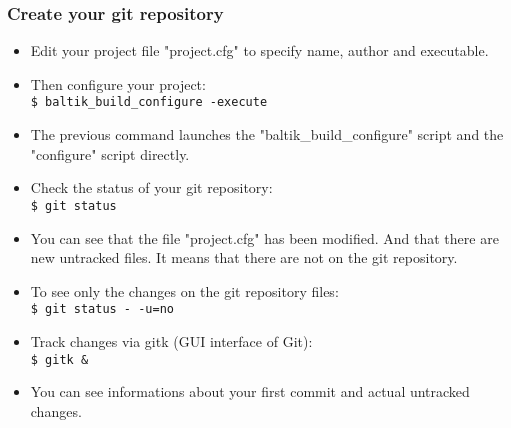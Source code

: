 \documentclass[10pt, hyperref={unicode=true,pdfusetitle, bookmarks=true,bookmarksnumbered=false,bookmarksopen=false, breaklinks=false,pdfborder={0 0 1},backref=true,colorlinks=true,linkcolor=darkblue,pageanchor, urlcolor=darkblue}]{beamer}
\begin{document}
\begin{frame}
\frametitle{Create your git repository}
\begin{block}{}

\begin{itemize}
\item Edit your project file "project.cfg" to specify name, author and executable.

\item Then configure your project:\\
\texttt{\$ baltik\_build\_configure -execute}\\

\item The previous command launches the "baltik\_build\_configure" script and the "configure" script directly.

\item Check the status of your git repository:\\
\texttt{\$ git status}\\

\item You can see that the file "project.cfg" has been modified. And that there are new untracked files.
It means that there are not on the git repository.

\item To see only the changes on the git repository files:\\
\texttt{\$ git status -\,-u=no}\\

\item Track changes via gitk (GUI interface of Git):\\
\texttt{\$ gitk \&}

\item You can see informations about your first commit and actual untracked changes.
\end{itemize}

\end{block}
\end{frame}
\end{document}
